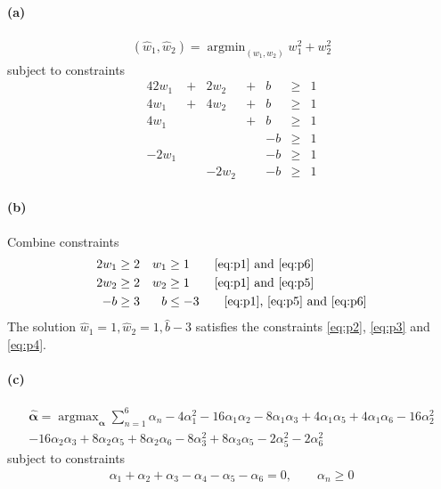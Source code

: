 \documentclass[a4paper,11pt]{article}
\DeclareMathOperator*{\argmax}{argmax}
\DeclareMathOperator*{\argmin}{argmin}
\begin{document}
\paragraph{(a)}
\begin{align*}
  (\hat{w}_1,\hat{w}_2)
  =\argmin_{(w_1,w_2)}w_1^2+w_2^2
\end{align*}
subject to constraints
\begin{alignat}{4}
  2w_1 &+& 2w_2 &+& b &\ge& 1\label{eq:p1}\\
  4w_1 &+& 4w_2 &+& b &\ge& 1\label{eq:p2}\\
  4w_1 & &      &+& b &\ge& 1\label{eq:p3}\\
       & &      & &-b &\ge& 1\label{eq:p4}\\
 -2w_1 & &      & &-b &\ge& 1\label{eq:p5}\\
       & &-2w_2 & &-b &\ge& 1\label{eq:p6}
\end{alignat}

\paragraph{(b)}
Combine constraints
\begin{align*}
  2w_1&\ge2 & w_1&\ge1 \tag*{\eqref{eq:p1} and \eqref{eq:p6}}\\
  2w_2&\ge2 & w_2&\ge1 \tag*{\eqref{eq:p1} and \eqref{eq:p5}}\\
    -b&\ge3 &   b&\le-3 \tag*{\eqref{eq:p1}, \eqref{eq:p5} and \eqref{eq:p6}}
\end{align*}
The solution $\hat{w}_1=1, \hat{w}_2=1, \hat{b}-3$ satisfies the constraints \eqref{eq:p2}, \eqref{eq:p3} and \eqref{eq:p4}.

\paragraph{(c)}
\begin{multline}
  \hat{\boldsymbol{\alpha}}=
  \argmax_{\boldsymbol{\alpha}}\sum_{n=1}^6\alpha_n
    -4\alpha_1^2
    -16\alpha_1\alpha_2
    -8\alpha_1\alpha_3
    +4\alpha_1\alpha_5
    +4\alpha_1\alpha_6
    -16\alpha_2^2\\
    -16\alpha_2\alpha_3
    +8\alpha_2\alpha_5
    +8\alpha_2\alpha_6
    -8\alpha_3^2
    +8\alpha_3\alpha_5
    -2\alpha_5^2
    -2\alpha_6^2\label{eq:dual}
\end{multline}
subject to constraints
\begin{align*}
\alpha_1+\alpha_2+\alpha_3-\alpha_4-\alpha_5-\alpha_6=0,\qquad\alpha_n\ge0
\end{align*}
\end{document}

